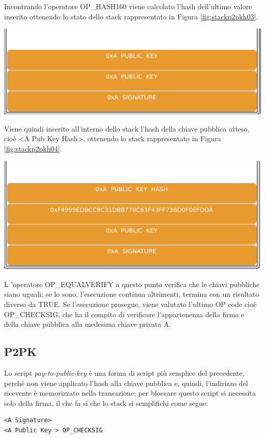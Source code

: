 Incontrando l’operatore OP\_HASH160 viene calcolato l’hash dell’ultimo valore inserito ottenendo lo stato dello stack rappresentato in Figura \ref{fig:stackp2pkh03}.

{\centering
\vspace{15pt}
\includegraphics[scale=0.35]{images/script/p2pkh/2.png}
\vspace{10pt}
\par}

Viene quindi inserito all’interno dello stack l’hash della chiave pubblica atteso, cioè <A Pub Key Hash>, ottenendo lo stack rappresentato in Figura \ref{fig:stackp2pkh04}.

{\centering
\vspace{15pt}
\includegraphics[scale=0.35]{images/script/p2pkh/4.png}
\vspace{10pt}
\par}

L ’operatore OP\_EQUALVERIFY a questo punto verifica che le chiavi pubbliche siano uguali; se lo sono, l’esecuzione continua altrimenti, termina con un risultato diverso da TRUE. Se l’esecuzione prosegue, viene valutato l’ultimo OP code cioè OP\_CHECKSIG, che ha il compito di verificare l’appartenenza della firma e della chiave pubblica alla medesima chiave privata A.
\subsection{P2PK}
Lo script {\it pay-to-public-key \/} è una forma di script più semplice del precedente, perché non viene applicato l’hash alla chiave pubblica e, quindi, l’indirizzo del ricevente è memorizzato nella transazione; per bloccare questo script si necessita solo della firma, il che fa sì che lo stack si semplifichi come segue:
\begin{lstlisting}[language=bitcoinscript, caption={P2PK Script completo.}]
<A Signature>
<A Public Key > OP_CHECKSIG
\end{lstlisting}


